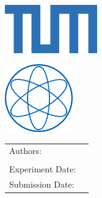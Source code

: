\begin{titlepage}

  \centering
   \vspace*{1\baselineskip}
  \includegraphics[width=0.3\textwidth]{TUMLogo.png}\\
  \vspace{0.5\baselineskip}
  \LARGE\textsc{\MakeUppercase{\getUniversity{}}}
  
  \vspace{1.5\baselineskip}
  \includegraphics[width=0.22\textwidth]{PH_Web}\\
  \LARGE\textsc{\getDepartment{}}

  \vspace{2\baselineskip}
  \huge\bfseries\textsc{\getTitle{}}

  \vspace{0.5\baselineskip}
  \LARGE\textsc{\getDoctype{}}

  \vspace{1.5\baselineskip}
  \large{\begin{tabular}{l l}
   Authors:              & \textnormal{\getAuthorI{}}             \\
                         & \textnormal{\getAuthorII{}}            \\
   Experiment Date:      & \textnormal{\getExperimentDate{}}      \\
   Submission Date:      & \textnormal{\getSubmissionDate{}}             
   \end{tabular}}
  
\end{titlepage}
\cleardoublepage
